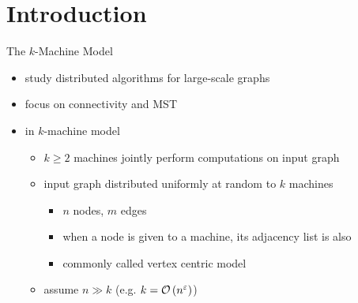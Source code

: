 \section{Introduction}
\begin{frame}{The $k$-Machine Model}
    \begin{itemize}
        \item study distributed algorithms for large-scale graphs
        \item focus on connectivity and MST
        \item in $k$-machine model
              \begin{itemize}
                  \item $k \geq 2$ machines jointly perform computations on input graph
                  \item input graph distributed uniformly at random to $k$ machines
                        \begin{itemize}
                            \item $n$ nodes, $m$ edges
                            \item when a node is given to a machine, its \alert{adjacency list} is also
                            \item commonly called \alert{vertex centric} model
                        \end{itemize}
                  \item assume $n \gg k$ (e.g. $k = \mathcal{O}\left(n^{\varepsilon}\right)$)
              \end{itemize}
    \end{itemize}
\end{frame}


